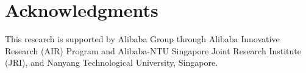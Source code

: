 \documentclass{article}
\begin{document}
\section*{Acknowledgments}
This research is supported by Alibaba Group through Alibaba Innovative Research (AIR) Program and Alibaba-NTU Singapore Joint Research Institute (JRI), and Nanyang Technological University, Singapore.



\end{document}
